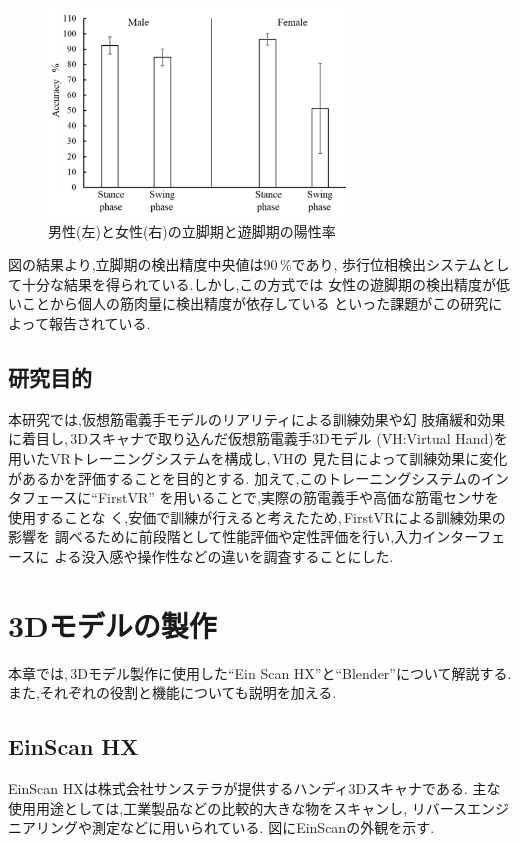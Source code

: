 \documentclass{ltjsreport}
\begin{document}
		\begin{figure}[H]
		\centering
		\includegraphics[width = 8cm]{../figs/sensors-21-01081-g010.jpg}
		\hspace{-32truemm}
		\caption{男性(左)と女性(右)の立脚期と遊脚期の陽性率\\}
		\label{fig:RR-malefemale}
		\end{figure}

		図の結果より,立脚期の検出精度中央値は90\,\%であり,
		歩行位相検出システムとして十分な結果を得られている.しかし,この方式では
		女性の遊脚期の検出精度が低いことから個人の筋肉量に検出精度が依存している
		といった課題がこの研究によって報告されている.

		\section{研究目的}
		本研究では,仮想筋電義手モデルのリアリティによる訓練効果や幻
		肢痛緩和効果に着目し,\,3Dスキャナで取り込んだ仮想筋電義手3Dモデル
		(VH:Virtual Hand)を用いたVRトレーニングシステムを構成し,\,VHの
		見た目によって訓練効果に変化があるかを評価することを目的とする.
		加えて,このトレーニングシステムのインタフェースに``FirstVR''\cite{ref:3}
		を用いることで,実際の筋電義手や高価な筋電センサを使用することな
		く,安価で訓練が行えると考えたため,\,FirstVRによる訓練効果の影響を
		調べるために前段階として性能評価や定性評価を行い,入力インターフェースに
		よる没入感や操作性などの違いを調査することにした.


\chapter{3Dモデルの製作}
	本章では,\,3Dモデル製作に使用した``Ein Scan HX''と``Blender''について解説する.
	また,それぞれの役割と機能についても説明を加える.

	\section{EinScan HX}
		EinScan HX\cite{ref:5}は株式会社サンステラが提供するハンディ3Dスキャナである.
		主な使用用途としては,工業製品などの比較的大きな物をスキャンし,
		リバースエンジニアリングや測定などに用いられている.
		図にEinScanの外観を示す.
\end{document}
